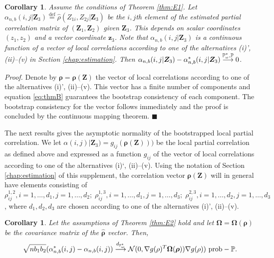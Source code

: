 \documentclass[
  12pt,
  letterpaper]{article}
\newtheorem{cor}[thm]{Corollary}
\numberwithin{equation}{section}
\newcommand{\Z}{\bm{Z}}
\newcommand{\z}{\bm{z}}
\newcommand{\frho}{\bm{\rho}}
\newcommand{\fOmega}{\bm{\Omega}}
\begin{document}
\begin{cor}
Assume the conditions of Theorem \ref{thm:E1}. Let $\alpha_{n,b}(i,j|\Z_3) \stackrel{\textrm{def}}{=} \widehat \rho(Z_{1i}, Z_{2j}|\Z_3)$ be the $i,j$th element of the estimated partial correlation matrix of $(\Z_1, \Z_2)$ given $\Z_3$. This depends on scalar coordinates $(z_1, z_2)$ and a vector coordinate $\z_3$. Note that $\alpha_{n,b}(i,j|\Z_3)$ is a continuous function of a vector of local correlations according to one of the alternatives (i)', (ii)--(v) in Section \ref{chap:estimation}. Then $\alpha_{n,b}(i,j|\Z_3) - \alpha^*_{n,b}(i,j|\Z_3) \buildrel {\mathbb{P}_{\omega}^{*},\mathbb{P}} \over {\longrightarrow} 0$. 
\label{cor:E3}
\end{cor}

\emph{Proof.} Denote by \(\frho = \frho(\Z)\) the vector of local correlations according to one of the alternatives (i)', (ii)--(v). This vector has a finite number of components and equation \eqref{eq:thmB} guarantees the bootstrap consistency of each component. The bootstrap consistency for the vector follows immediately and the proof is concluded by the continuous mapping theorem. \(\blacksquare\)

The next results gives the asymptotic normality of the bootstrapped local partial correlation. We let \(\alpha(i,j)|\Z_3) = g_{ij}(\frho(\Z)))\) be the local partial correlation as defined above and expressed as a function \(g_{ij}\) of the vector of local correlations according to one of the alternatives (i)`, (ii)--(v). Using the notation of Section \ref{chap:estimation} of this supplement, the correlation vector \(\frho(\Z)\) will in general have elements consisting of \(\rho_{ij}^{1,2}, i =1,\ldots,d_1, j=1,\ldots,d_2;\;\rho_{ij}^{1,3}, i=1,\ldots,d_1, j=1,\ldots,d_3;\;\rho_{ij}^{2,3}, i=1,\ldots,d_2, j=1,\ldots,d_3\), where \(d_1,d_2,d_3\) are chosen according to one of the alternatives (i)', (ii)--(v).

\begin{cor}
Let the assumptions of Theorem \ref{thm:E2} hold and let $\fOmega = \fOmega(\frho)$ be the covariance matrix of the $\widehat{\frho}$ vector. Then,
$$
\sqrt{nb_1b_2}(\alpha_{n,b}^*(i,j)-\alpha_{n,b}(i,j)) \buildrel {d_{\mathbb{P}_{\omega}^{*}}} \over {\longrightarrow} {\cal N}(0,\nabla g(\rho)^T \fOmega(\frho)) \nabla g(\rho)) \,\, \mbox{prob}-\mathbb{P}. 
$$ 
\label{cor:E4}
\end{cor}
\end{document}
